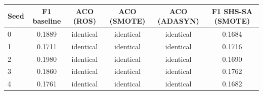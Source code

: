 \begin{tabular}{lccccc}
\toprule
Seed & F1 baseline & ACO (ROS) & ACO (SMOTE) & ACO (ADASYN) & F1 SHS-SA (SMOTE) \\
\midrule
0 & 0.1889 & identical & identical & identical & 0.1684 \\
1 & 0.1711 & identical & identical & identical & 0.1716 \\
2 & 0.1980 & identical & identical & identical & 0.1690 \\
3 & 0.1860 & identical & identical & identical & 0.1762 \\
4 & 0.1761 & identical & identical & identical & 0.1682 \\
\bottomrule
\end{tabular}
